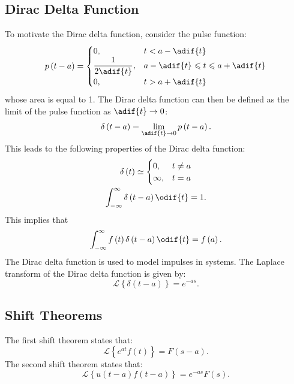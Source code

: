 \documentclass{article}
\begin{document}
\subsection{Dirac Delta Function}
To motivate the Dirac delta function, consider the pulse function:
\begin{equation*}
    p\left( t - a \right) =
    \begin{cases}
        \displaystyle 0,                    & t < a - \adif{t}                                \\
        \displaystyle \frac{1}{2 \adif{t}}, & a - \adif{t} \leqslant t \leqslant a + \adif{t} \\
        \displaystyle 0,                    & t > a + \adif{t}
    \end{cases}
\end{equation*}
whose area is equal to 1.
The Dirac delta function can then be defined as the limit of the pulse
function as \(\adif{t} \to 0\):
\begin{equation*}
    \delta\left( t - a \right) = \lim_{\adif{t} \to 0} p\left( t - a \right).
\end{equation*}
This leads to the following properties of the Dirac delta function:
\begin{gather*}
    \delta\left( t \right) \simeq
    \begin{cases}
        0,      & t \neq a \\
        \infty, & t = a
    \end{cases}
    \\
    \int_{-\infty}^\infty \delta\left( t - a \right) \odif{t} = 1.
\end{gather*}
This implies that
\begin{equation*}
    \int_{-\infty}^\infty f\left( t \right) \delta\left( t - a \right) \odif{t} = f\left( a \right).
\end{equation*}
The Dirac delta function is used to model impulses in systems. The
Laplace transform of the Dirac delta function is given by:
\begin{equation*}
    \mathscr{L}\left\{ \delta\left( t - a \right) \right\} = e^{-as}.
\end{equation*}
\subsection{Shift Theorems}
The first shift theorem states that:
\begin{equation*}
    \mathscr{L}\left\{ e^{at} f\left( t \right) \right\} = F\left( s - a \right).
\end{equation*}
The second shift theorem states that:
\begin{equation*}
    \mathscr{L}\left\{ u\left( t - a \right) f\left( t - a \right) \right\} = e^{-as} F\left( s \right).
\end{equation*}
\end{document}
